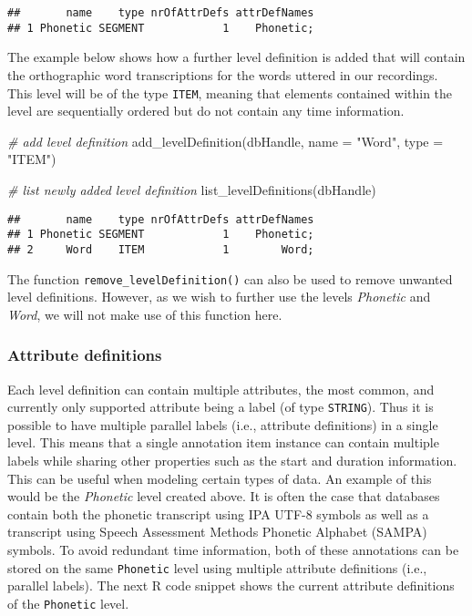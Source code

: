 \documentclass[
]{book}
\newenvironment{Shaded}{\begin{snugshade}}{\end{snugshade}}
\newcommand{\AttributeTok}[1]{\textcolor[rgb]{0.77,0.63,0.00}{#1}}
\newcommand{\CommentTok}[1]{\textcolor[rgb]{0.56,0.35,0.01}{\textit{#1}}}
\newcommand{\FunctionTok}[1]{\textcolor[rgb]{0.00,0.00,0.00}{#1}}
\newcommand{\NormalTok}[1]{#1}
\newcommand{\StringTok}[1]{\textcolor[rgb]{0.31,0.60,0.02}{#1}}
\begin{document}
\begin{verbatim}
##       name    type nrOfAttrDefs attrDefNames
## 1 Phonetic SEGMENT            1    Phonetic;
\end{verbatim}

The example below shows how a further level definition is added that will contain the orthographic word transcriptions for the words uttered in our recordings. This level will be of the type \texttt{ITEM}, meaning that elements contained within the level are sequentially ordered but do not contain any time information.

\begin{Shaded}
\begin{Highlighting}[]
\CommentTok{\# add level definition}
\FunctionTok{add\_levelDefinition}\NormalTok{(dbHandle,}
                    \AttributeTok{name =} \StringTok{"Word"}\NormalTok{,}
                    \AttributeTok{type =} \StringTok{"ITEM"}\NormalTok{)}

\CommentTok{\# list newly added level definition}
\FunctionTok{list\_levelDefinitions}\NormalTok{(dbHandle)}
\end{Highlighting}
\end{Shaded}

\begin{verbatim}
##       name    type nrOfAttrDefs attrDefNames
## 1 Phonetic SEGMENT            1    Phonetic;
## 2     Word    ITEM            1        Word;
\end{verbatim}

The function \texttt{remove\_levelDefinition()} can also be used to remove unwanted level definitions. However, as we wish to further use the levels \emph{Phonetic} and \emph{Word}, we will not make use of this function here.

\hypertarget{attribute-definitions}{%
\subsubsection{Attribute definitions}\label{attribute-definitions}}

Each level definition can contain multiple attributes, the most common, and currently only supported attribute being a label (of type \texttt{STRING}). Thus it is possible to have multiple parallel labels (i.e., attribute definitions) in a single level. This means that a single annotation item instance can contain multiple labels while sharing other properties such as the start and duration information. This can be useful when modeling certain types of data. An example of this would be the \emph{Phonetic} level created above. It is often the case that databases contain both the phonetic transcript using IPA UTF-8 symbols as well as a transcript using Speech Assessment Methods Phonetic Alphabet (SAMPA) symbols. To avoid redundant time information, both of these annotations can be stored on the same \texttt{Phonetic} level using multiple attribute definitions (i.e., parallel labels). The next R code snippet shows the current attribute definitions of the \texttt{Phonetic} level.
\end{document}

